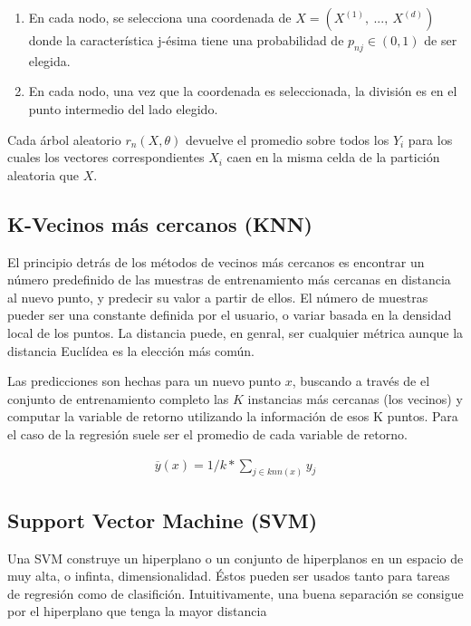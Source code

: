 \begin{enumerate}
  \item En cada nodo, se selecciona una coordenada de $X = (X^{(1)}, \ ...,\ X^{(d)})$
        donde la característica j-ésima tiene una probabilidad de $p_{nj} \in (0,1)$
        de ser elegida.
  \item En cada nodo, una vez que la coordenada es seleccionada, la división es
        en el punto intermedio del lado elegido.
\end{enumerate}
Cada árbol aleatorio $r_{n}(X, \theta)$ devuelve el promedio sobre todos los
$Y_{i}$ para los cuales los vectores correspondientes $X_{i}$ caen en la misma
celda de la partición aleatoria que $X$.


\subsection{K-Vecinos más cercanos (KNN)}
El principio detrás de los métodos de vecinos más cercanos es encontrar un
número predefinido de las muestras de entrenamiento más cercanas en distancia
al nuevo punto, y predecir su valor a partir de ellos.
El número de muestras pueder ser una constante definida por el usuario, o
variar basada en la densidad local de los puntos. La distancia puede, en genral,
ser cualquier métrica aunque la distancia Euclídea es la elección más común.

Las predicciones son hechas para un nuevo punto $x$, buscando a través de el conjunto
de entrenamiento completo las $K$ instancias más cercanas (los vecinos) y computar
la variable de retorno utilizando la información de esos K puntos. Para el caso
de la regresión suele ser el promedio de cada variable de retorno.

\begin{align}
  \overline{y}(x) = 1/k * \sum_{j \in knn(x)} y_{j}
\end{align}



\subsection{Support Vector Machine (SVM)}

Una SVM construye un hiperplano o un conjunto de hiperplanos en un espacio
de muy alta, o infinta, dimensionalidad. Éstos pueden ser usados tanto para
tareas de regresión como de clasifición. Intuitivamente, una buena separación
se consigue por el hiperplano que tenga la mayor distancia 















